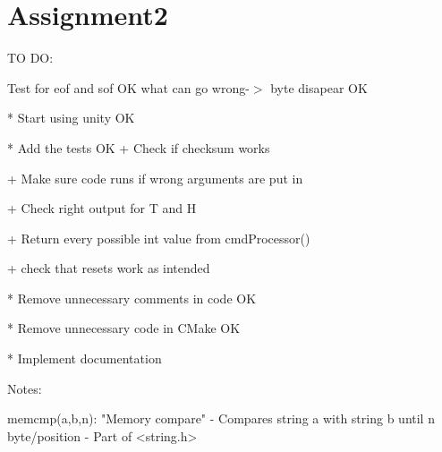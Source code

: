 \chapter{Assignment2}
\hypertarget{md__r_e_a_d_m_e}{}\label{md__r_e_a_d_m_e}
\label{md__r_e_a_d_m_e_autotoc_md0}%
%


TO DO\+:

Test for eof and sof OK what can go wrong-\/\texorpdfstring{$>$}{>} byte disapear OK \begin{DoxyVerb}* Start using unity OK

* Add the tests OK
    + Check if checksum works 

    + Make sure code runs if wrong arguments are put in 

    + Check right output for T and H

    + Return every possible int value from cmdProcessor()

    + check that resets work as intended 

* Remove unnecessary comments in code OK

* Remove unnecessary code in CMake OK 

* Implement documentation
\end{DoxyVerb}


Notes\+: \begin{DoxyVerb}memcmp(a,b,n): "Memory compare" 
                    - Compares string a with string b until n byte/position
                    - Part of <string.h>
\end{DoxyVerb}
 